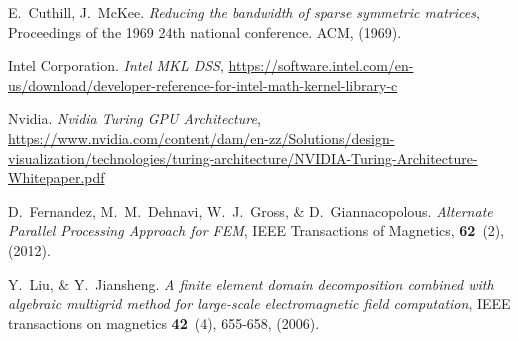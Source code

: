 \begin{thebibliography}{99}
 E.~Cuthill, J.~McKee. {\em Reducing the bandwidth of sparse symmetric matrices}, Proceedings of the 1969 24th national conference. ACM, (1969).

 Intel Corporation. {\em Intel MKL DSS}, \url{https://software.intel.com/en-us/download/developer-reference-for-intel-math-kernel-library-c}

 Nvidia. {\em Nvidia Turing GPU Architecture}, \url{https://www.nvidia.com/content/dam/en-zz/Solutions/design-visualization/technologies/turing-architecture/NVIDIA-Turing-Architecture-Whitepaper.pdf}

 D.~Fernandez, M.~M.~Dehnavi, W.~J.~Gross, \& D.~Giannacopolous. {\em Alternate Parallel Processing Approach for FEM}, IEEE Transactions of Magnetics, \textbf{62}~(2), (2012).

 Y.~Liu, \& Y.~Jiansheng. {\em A finite element domain decomposition combined with algebraic multigrid method for large-scale electromagnetic field computation},  IEEE transactions on magnetics \textbf{42}~(4), 655-658, (2006).


\end{thebibliography}